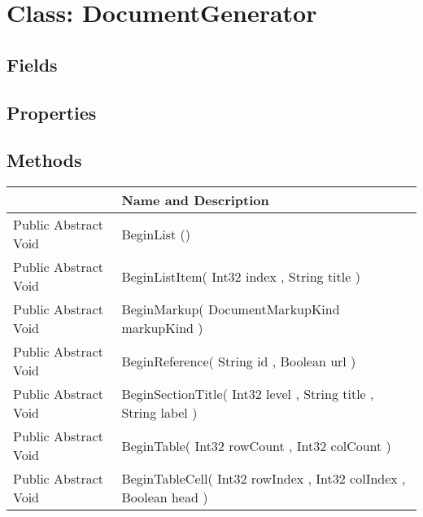 \documentclass[11pt, oneside, a4paper]{book}
\begin{document}
\section{Class: DocumentGenerator}

\subsection{Fields}

\subsection{Properties}

\subsection{Methods}
\begin{center}
\begin{tabular}{| p{3cm} | p{12cm} | }
\hline
\textbf{ } & \textbf{ Name and Description}\\
\hline
 Public  Abstract  Void &  BeginList ()\hypertarget{SoftwareEngineeringTools.{}Documentation.{}DocumentGenerator.{}BeginList}{}\\
\hline
 Public  Abstract  Void &  BeginListItem(\hypertarget{SoftwareEngineeringTools.{}Documentation.{}DocumentGenerator.{}BeginListItem\_Int32\_String}{} Int32  index  ,  String  title  )\\
\hline
 Public  Abstract  Void &  BeginMarkup(\hypertarget{SoftwareEngineeringTools.{}Documentation.{}DocumentGenerator.{}BeginMarkup\_DocumentMarkupKind}{} DocumentMarkupKind  markupKind  )\\
\hline
 Public  Abstract  Void &  BeginReference(\hypertarget{SoftwareEngineeringTools.{}Documentation.{}DocumentGenerator.{}BeginReference\_String\_Boolean}{} String  id  ,  Boolean  url  )\\
\hline
 Public  Abstract  Void &  BeginSectionTitle(\hypertarget{SoftwareEngineeringTools.{}Documentation.{}DocumentGenerator.{}BeginSectionTitle\_Int32\_String\_String}{} Int32  level  ,  String  title  ,  String  label  )\\
\hline
 Public  Abstract  Void &  BeginTable(\hypertarget{SoftwareEngineeringTools.{}Documentation.{}DocumentGenerator.{}BeginTable\_Int32\_Int32}{} Int32  rowCount  ,  Int32  colCount  )\\
\hline
 Public  Abstract  Void &  BeginTableCell(\hypertarget{SoftwareEngineeringTools.{}Documentation.{}DocumentGenerator.{}BeginTableCell\_Int32\_Int32\_Boolean}{} Int32  rowIndex  ,  Int32  colIndex  ,  Boolean  head  )\\

\end{tabular}
\end{center}
\end{document}
